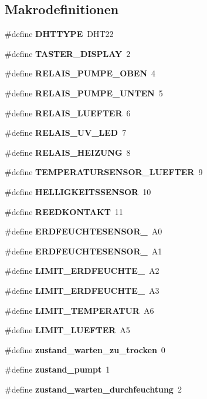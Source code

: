 \subsection*{Makrodefinitionen}
\begin{DoxyCompactItemize}
\item 
\#define \textbf{ D\+H\+T\+T\+Y\+PE}~D\+H\+T22
\item 
\#define \textbf{ T\+A\+S\+T\+E\+R\+\_\+\+D\+I\+S\+P\+L\+AY}~2
\item 
\#define \textbf{ R\+E\+L\+A\+I\+S\+\_\+\+P\+U\+M\+P\+E\+\_\+\+O\+B\+EN}~4
\item 
\#define \textbf{ R\+E\+L\+A\+I\+S\+\_\+\+P\+U\+M\+P\+E\+\_\+\+U\+N\+T\+EN}~5
\item 
\#define \textbf{ R\+E\+L\+A\+I\+S\+\_\+\+L\+U\+E\+F\+T\+ER}~6
\item 
\#define \textbf{ R\+E\+L\+A\+I\+S\+\_\+\+U\+V\+\_\+\+L\+ED}~7
\item 
\#define \textbf{ R\+E\+L\+A\+I\+S\+\_\+\+H\+E\+I\+Z\+U\+NG}~8
\item 
\#define \textbf{ T\+E\+M\+P\+E\+R\+A\+T\+U\+R\+S\+E\+N\+S\+O\+R\+\_\+\+L\+U\+E\+F\+T\+ER}~9
\item 
\#define \textbf{ H\+E\+L\+L\+I\+G\+K\+E\+I\+T\+S\+S\+E\+N\+S\+OR}~10
\item 
\#define \textbf{ R\+E\+E\+D\+K\+O\+N\+T\+A\+KT}~11
\item 
\#define \textbf{ E\+R\+D\+F\+E\+U\+C\+H\+T\+E\+S\+E\+N\+S\+O\+R\+\_}~A0
\item 
\#define \textbf{ E\+R\+D\+F\+E\+U\+C\+H\+T\+E\+S\+E\+N\+S\+O\+R\+\_}~A1
\item 
\#define \textbf{ L\+I\+M\+I\+T\+\_\+\+E\+R\+D\+F\+E\+U\+C\+H\+T\+E\+\_}~A2
\item 
\#define \textbf{ L\+I\+M\+I\+T\+\_\+\+E\+R\+D\+F\+E\+U\+C\+H\+T\+E\+\_}~A3
\item 
\#define \textbf{ L\+I\+M\+I\+T\+\_\+\+T\+E\+M\+P\+E\+R\+A\+T\+UR}~A6
\item 
\#define \textbf{ L\+I\+M\+I\+T\+\_\+\+L\+U\+E\+F\+T\+ER}~A5
\item 
\#define \textbf{ zustand\+\_\+warten\+\_\+zu\+\_\+trocken}~0
\item 
\#define \textbf{ zustand\+\_\+pumpt}~1
\item 
\#define \textbf{ zustand\+\_\+warten\+\_\+durchfeuchtung}~2
\end{DoxyCompactItemize}
